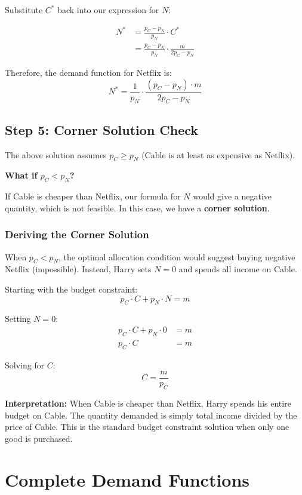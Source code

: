 \documentclass[11pt,a4paper]{article}
\begin{document}
Substitute $C^*$ back into our expression for $N$:

\begin{align*}
N^* &= \frac{p_C - p_N}{p_N} \cdot C^* \\
&= \frac{p_C - p_N}{p_N} \cdot \frac{m}{2p_C - p_N}
\end{align*}

Therefore, the demand function for Netflix is:
\[
\boxed{N^* = \frac{1}{p_N} \cdot \frac{(p_C - p_N) \cdot m}{2p_C - p_N}}
\]

\subsection{Step 5: Corner Solution Check}

The above solution assumes $p_C \geq p_N$ (Cable is at least as expensive as Netflix).

\textbf{What if $p_C < p_N$?}

If Cable is cheaper than Netflix, our formula for $N$ would give a negative quantity, which is not feasible. In this case, we have a \textbf{corner solution}.

\subsubsection{Deriving the Corner Solution}

When $p_C < p_N$, the optimal allocation condition would suggest buying negative Netflix (impossible). Instead, Harry sets $N = 0$ and spends all income on Cable.

Starting with the budget constraint:
\[
p_C \cdot C + p_N \cdot N = m
\]

Setting $N = 0$:
\begin{align*}
p_C \cdot C + p_N \cdot 0 &= m \\
p_C \cdot C &= m
\end{align*}

Solving for $C$:
\[
\boxed{C = \frac{m}{p_C}}
\]

\textbf{Interpretation:} When Cable is cheaper than Netflix, Harry spends his entire budget on Cable. The quantity demanded is simply total income divided by the price of Cable. This is the standard budget constraint solution when only one good is purchased.

\section{Complete Demand Functions}
\end{document}
